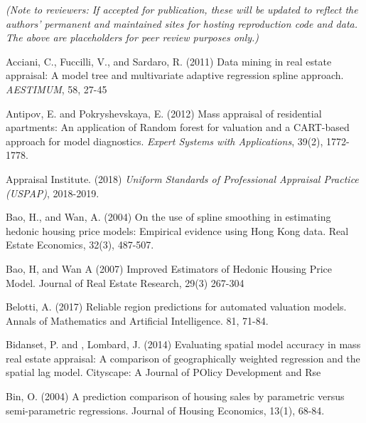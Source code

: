 \documentclass[colTwo]{format}
\theoremstyle{definition}
\begin{document}
\textit{(Note to reviewers: If accepted for publication, these will be updated to reflect the authors’ permanent and maintained sites for hosting reproduction code and data. The above are placeholders for peer review purposes only.)}


\begin{thebibliography}{50}			
\harvarditem{}{}{}Acciani, C., Fuccilli, V., and Sardaro, R. (2011) Data mining in real estate appraisal: A model tree and multivariate adaptive regression spline approach. \textit{AESTIMUM}, 58, 27-45

\harvarditem{}{}{}Antipov, E. and Pokryshevskaya, E. (2012) Mass appraisal of residential apartments: An application of Random forest for valuation and a CART-based approach for model diagnostics. \textit{Expert Systems with Applications}, 39(2), 1772-1778.

\harvarditem{}{}{}Appraisal Institute. (2018) \textit{Uniform Standards of Professional Appraisal Practice (USPAP)}, 2018-2019.

\harvarditem{}{}{}Bao, H., and Wan, A. (2004) On the use of spline smoothing in estimating hedonic housing price models: Empirical evidence using Hong Kong data. Real Estate Economics, 32(3), 487-507. 

\harvarditem{}{}{}Bao, H, and Wan A (2007) Improved Estimators of Hedonic Housing Price Model. Journal of Real Estate Research, 29(3) 267-304

\harvarditem{}{}{}Belotti, A. (2017) Reliable region predictions for automated valuation models. Annals of Mathematics and Artificial Intelligence. 81, 71-84. 

\harvarditem{}{}{}Bidanset, P. and , Lombard, J. (2014) Evaluating spatial model accuracy in mass real estate appraisal: A comparison of geographically weighted regression and the spatial lag model. Cityscape: A Journal of POlicy Development and Rse

\harvarditem{}{}{}Bin, O. (2004) A prediction comparison of housing sales by parametric versus semi-parametric regressions. Journal of Housing Economics, 13(1), 68-84. 


\end{thebibliography}
\end{document}
